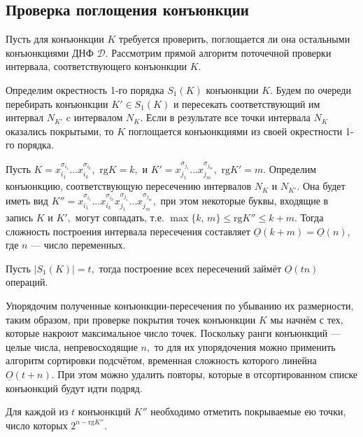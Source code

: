 \documentclass[12pt,a4paper,oneside,fleqn,leqno]{article}
\theoremstyle{definition}
\begin{document}
		\subsection{Проверка поглощения конъюнкции}
			Пусть для конъюнкции $K$ требуется проверить, поглощается ли она остальными конъюнкциями ДНФ $\mathcal{D}.$ Рассмотрим прямой алгоритм поточечной проверки интервала, соответствующего конъюнкции $K.$\par
			Определим окрестность 1-го порядка $S_1(K)$ конъюнкции $K.$ Будем по очереди перебирать конъюнкции $K' \in S_1(K)$ и пересекать соответствующий им интервал $N_{K'}$ c интервалом $N_K.$ Если в результате все точки интервала $N_K$ оказались покрытыми, то $K$ поглощается конъюнкциями из своей окрестности 1-го порядка.\par
			Пусть $K = x_{i_1}^{\sigma_{i_1}} \ldots x_{i_k}^{\sigma_{i_k}},\,\, \text{rg}K = k,$ и $K' = x_{j_1}^{\sigma_{j_1}} \ldots x_{j_m}^{\sigma_{j_m}},\,\, \text{rg}K' = m.$ Определим конъюнкцию, соответствующую пересечению интервалов $N_K$ и $N_{K'}.$ Она будет иметь вид $K'' = x_{i_1}^{\sigma_{i_1}} \ldots x_{i_k}^{\sigma_{i_k}} x_{j_1}^{\sigma_{j_1}} \ldots x_{j_m}^{\sigma_{j_m}},$ при этом некоторые буквы, входящие в запись $K$ и $K',$ могут совпадать, т.е. $\max\{k,\,m\} \leqslant \text{rg}K'' \leqslant k + m.$ Тогда сложность построения интервала пересечения составляет $\underline{O}(k + m) = \underline{O}(n),$ где $n$ --- число переменных.\par
			Пусть $|S_1(K)| = t,$ тогда построение всех пересечений займёт $\underline{O}(tn)$ операций.\par
			Упорядочим полученные конъюнкции-пересечения по убыванию их размерности, таким образом, при проверке покрытия точек конъюнкции $K$ мы начнём с тех, которые накроют максимальное число точек. Поскольку ранги конъюнкций --- целые числа, непревосходящие $n,$ то для их упорядочения можно применить алгоритм сортировки подсчётом, временная сложность которого линейна $\underline{O}(t + n).$ При этом можно удалить повторы, которые в отсортированном списке конъюнкций будут идти подряд.\par
			Для каждой из $t$ конъюнкций $K''$ необходимо отметить покрываемые ею точки, число которых $2^{n - \text{rg}K''}.$\par
\end{document}
